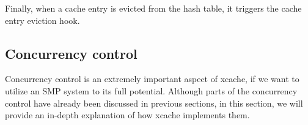 Finally, when a cache entry is evicted from the hash table, it triggers the 
cache entry eviction hook.

\begin{comment}
\begin{itemize}
	\item Insert a new entry to the LRU list
	\item Evict the LRU entry
	\item Update an entry's access time (i.e. mark it as MRU)
	\item Remove an arbitrary entry
\end{itemize}

Lets explain these fields a bit:

\begin{description}
	\item[lru:] Obviously, it's the least recently used entry. It can be 
		considered as the one end of the doubly linked list.
	\item[mru:] The entry that has just been used. It can be considered as 
		the other end of the doubly-linked list
	\item[younger:] This entry-specific field points to an entry used right 
		after our entry was used.
	\item[older:] Same as "younger", it points to the entry that has been 
		used right before our entry was used.
\end{description}

Finally, as we have explained in Section \ref{sec:xcache-evict-design}, the 
eviction internals should normally not bother the user. However, if the user 
wants to, \xcache exposes the following functions:

\begin{description}
	\item[xcache\_evict\_lru:] The name says it all, it evicts the recently 
		used item.
	\item[xcache\_peek\_and\_get\_lru:] This function allows the user to 
		atomically take a peek on the Least Recently Used entry and also 
		update its refcount.
\end{description}
\end{comment}

\subsection{Concurrency control}\label{sec:xcache-conc-imp}

Concurrency control is an extremely important aspect of xcache, if we want to 
utilize an SMP system to its full potential. Although parts of the concurrency 
control have already been discussed in previous sections, in this section, we 
will provide an in-depth explanation of how xcache implements them.

